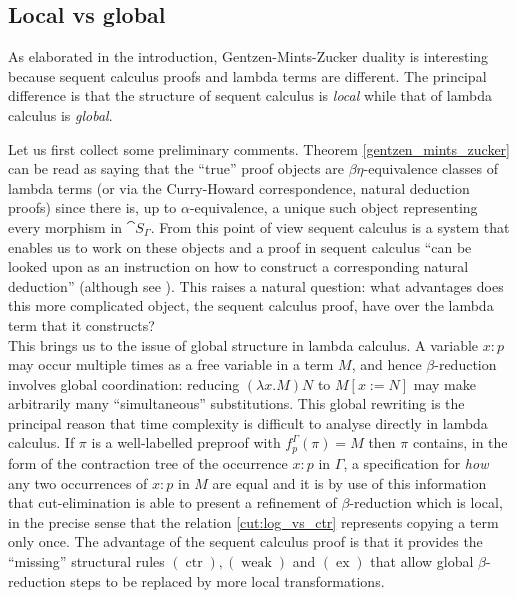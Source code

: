 \documentclass[english,letter paper,12pt,leqno]{article}
\theoremstyle{example}
\numberwithin{equation}{section}
\begin{document}
\subsection{Local vs global}\label{section:comparison}

As elaborated in the introduction, Gentzen-Mints-Zucker duality is interesting because sequent calculus proofs and lambda terms are different. The principal difference is that the structure of sequent calculus is \emph{local} while that of lambda calculus is \emph{global}.

Let us first collect some preliminary comments. Theorem \ref{gentzen_mints_zucker} can be read as saying that the ``true'' proof objects are $\beta\eta$-equivalence classes of lambda terms (or via the Curry-Howard correspondence, natural deduction proofs) since there is, up to $\alpha$-equivalence, a unique such object representing every morphism in $\cat{S}_\Gamma$. From this point of view sequent calculus is a system that enables us to work on these objects \cite[p.39]{girard_blind} and a proof in sequent calculus ``can be looked upon as an instruction on how to construct a corresponding natural deduction'' \cite[\S A.2]{prawitz} (although see \cite[\S 1.5.1]{zucker}). This raises a natural question: what advantages does this more complicated object, the sequent calculus proof, have over the lambda term that it constructs?
\\

This brings us to the issue of global structure in lambda calculus. A variable $x:p$ may occur multiple times as a free variable in a term $M$, and hence $\beta$-reduction involves global coordination: reducing $(\lambda x.M) N$ to $M[ x:= N ]$ may make arbitrarily many ``simultaneous'' substitutions. This global rewriting is the principal reason that time complexity is difficult to analyse directly in lambda calculus. If $\pi$ is a well-labelled preproof with $f^\Gamma_p(\pi) = M$ then $\pi$ contains, in the form of the contraction tree of the occurrence $x:p$ in $\Gamma$, a specification for \emph{how} any two occurrences of $x:p$ in $M$ are equal and it is by use of this information that cut-elimination is able to present a refinement of $\beta$-reduction which is local, in the precise sense that the relation \eqref{cut:log_vs_ctr} represents copying a term only once. The advantage of the sequent calculus proof is that it provides the ``missing'' structural rules $(\operatorname{ctr}), (\operatorname{weak})$ and $(\operatorname{ex})$ that allow global $\beta$-reduction steps to be replaced by more local transformations.
\end{document}
